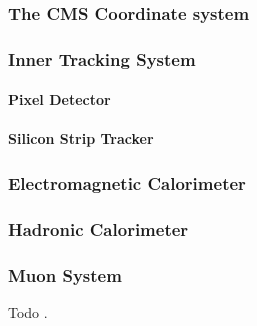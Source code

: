 \label{sec:experimental_setup}


\subsubsection{The CMS Coordinate system}

\subsubsection{Inner Tracking System}
\paragraph{Pixel Detector}
\paragraph{Silicon Strip Tracker}

\subsubsection{Electromagnetic Calorimeter}
\subsubsection{Hadronic Calorimeter}
\subsubsection{Muon System}

\newpage
Todo \cite{CaloReport:1997}.
